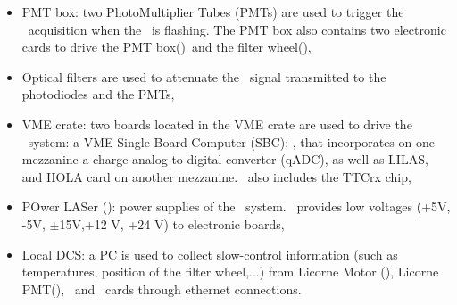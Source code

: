 \begin{itemize}
\item PMT box: two PhotoMultiplier Tubes (PMTs) are used to trigger the \lasii~acquisition when the \laser~is flashing. The PMT box also contains two electronic cards to drive the PMT box(\licpmt)~and the filter wheel(\licmot),

\item Optical filters are used to attenuate the \laser~signal transmitted to the photodiodes and the PMTs,

\item VME crate: two boards located in the VME crate are used to drive the \lasii~system: a VME Single Board Computer (SBC); \lascar, that incorporates on one mezzanine a charge analog-to-digital converter (qADC), as well as LILAS, and HOLA card on another mezzanine. \lascar~also includes the TTCrx chip,

\item POwer LASer (\polas): power supplies of the \lasii~system. \polas~provides low voltages (+5V, -5V, $\pm$15V,+12 V, +24 V) to electronic boards,

\item Local DCS: a PC is used to collect slow-control information (such as temperatures, position of the filter wheel,...) from Licorne Motor (\licmot), Licorne PMT(\licpmt), \licphd~and \lascar~cards through ethernet connections.


\end{itemize}